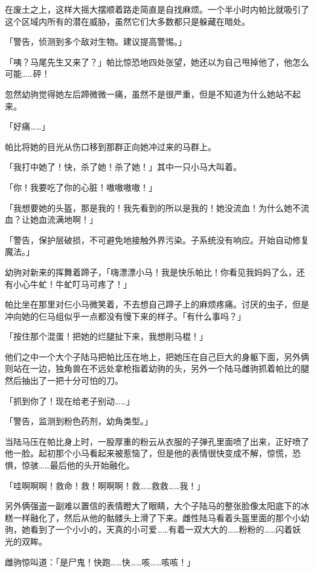 \horizonline

在废土之上，这样大摇大摆顺着路走简直是自找麻烦。一个半小时内帕比就吸引了这个区域内所有的潜在威胁，虽然它们大多数都只是躲藏在暗处。

「{\mt 警告，侦测到多个敌对生物。建议提高警惕。}」

「咦？马尾先生又来了？」帕比惊恐地四处张望，她还以为自己甩掉他了，他怎么可能……砰！


忽然幼驹觉得她左后蹄微微一痛，虽然不是很严重，但是不知道为什么她站不起来。

「好痛……」

帕比将她的目光从伤口移到那群正向她冲过来的马群上。

「我打中她了！快，杀了她！杀了她！」其中一只小马大叫着。

「你！我要吃了你的心脏！嗷嗷嗷嗷！」

「我想要她的头盔，那是我的！我先看到的所以是我的！她没流血！为什么她不流血？让她血流满地啊！」

「{\mt 警告，保护层破损，不可避免地接触外界污染。子系统没有响应。开始自动修复魔法。}」

幼驹对新来的挥舞着蹄子，「嗨漂漂小马！我是快乐帕比！你看见我妈妈了么，还有小心牛虻！牛虻叮马可疼了！」

帕比坐在那里对仨小马微笑着，不去想自己蹄子上的麻烦疼痛。讨厌的虫子，但是冲向她的仨马组似乎一点都没有慢下来的样子。「有什么事吗？」

「按住那个混蛋！把她的烂腿扯下来，我想削马棍！」

他们之中一个大个子陆马把帕比压在地上，把她压在自己巨大的身躯下面，另外俩则站在一边，独角兽在不远处拿枪指着幼驹的头，另外一个陆马雌驹抓着帕比的腿然后抽出了一把十分可怕的刀。

「抓到你了！现在给老子别动……」

「{\mt 警告，监测到粉色药剂，幼角类型。}」

当陆马压在帕比身上时，一股厚重的粉云从衣服的子弹孔里面喷了出来，正好喷了他一脸。起初那个小马看起来被惹恼了，但是他的表情很快变成不解，惊慌，恐惧，惊骇……最后他的头开始融化。

「哇啊啊啊！救命！救！啊啊啊！救……救救……我！」

另外俩强盗一副难以置信的表情瞪大了眼睛，大个子陆马的整张脸像太阳底下的冰糕一样融化了，然后从他的骷髅头上滑了下来。雌性陆马看着头盔里面的那个小幼驹，她看到了一个小小的，天真的小可爱……有着一双大大的……粉粉的……闪着妖光的双眸。

雌驹惊叫道：「是尸鬼！快跑……快……咳……咳咳！」

